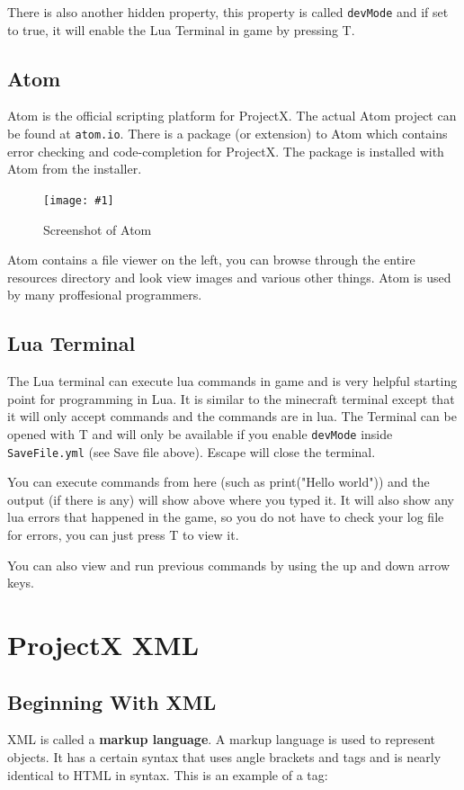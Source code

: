 \documentclass{book}
\newcommand{\fFigure}[2]
	{\begin{figure}[ht!]
		\centering
		\texttt{[image: \#1]}
		\caption{#2}
	\end{figure}}
\begin{document}
	There is also another hidden property, this property is called \texttt{devMode} and if set to true, it will enable the Lua Terminal in game by pressing T.
	\section{Atom}
	Atom is the official scripting platform for ProjectX. The actual Atom project can be found at \texttt{atom.io}. There is a package (or extension) to Atom which contains error checking and code-completion for ProjectX. The package is installed with Atom from the installer.
	
	\fFigure{Atom.png}{Screenshot of Atom}

	Atom contains a file viewer on the left, you can browse through the entire resources directory and look view images and various other things. Atom is used by many proffesional programmers.

	\section{Lua Terminal}
	The Lua terminal can execute lua commands in game and is very helpful starting point for programming in Lua. It is similar to the minecraft terminal except that it will only accept commands and the commands are in lua. The Terminal can be opened with T and will only be available if you enable \texttt{devMode} inside \texttt{SaveFile.yml} (see Save file above). Escape will close the terminal.

	You can execute commands from here (such as print("Hello world")) and the output (if there is any) will show above where you typed it. It will also show any lua errors that happened in the game, so you do not have to check your log file for errors, you can just press T to view it.
	
	You can also view and run previous commands by using the up and down arrow keys.

	\chapter{ProjectX XML}
	\section{Beginning With XML}
	XML is called a \textbf{markup language}. A markup language is used to represent objects. It has a certain syntax that uses angle brackets and tags and is nearly identical to HTML in syntax. This is an example of a tag:
	
\end{document}

